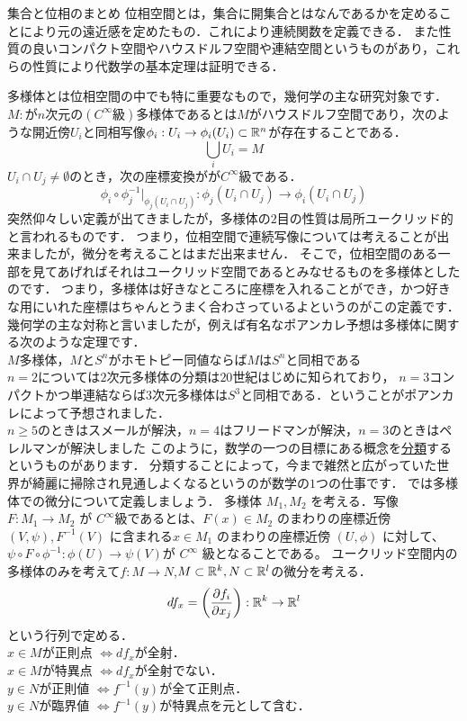 \proofx
\begin{itembox}[l]{集合と位相のまとめ}
位相空間とは，集合に開集合とはなんであるかを定めることにより元の遠近感を定めたもの．これにより連続関数を定義できる．
また性質の良いコンパクト空間やハウスドルフ空間や連結空間というものがあり，これらの性質により代数学の基本定理は証明できる．
\end{itembox}
多様体とは位相空間の中でも特に重要なもので，幾何学の主な研究対象です．
$M:$が$n$次元の$(C^\infty 級)$多様体であるとは$M$がハウスドルフ空間であり，次のような開近傍$U_i$と同相写像$\phi_i : U_i \to \phi_i(U_i) \subset \mathbb R^n$が存在することである．\\
\[ \bigcup_i U_i = M \]
$U_i \cap U_j \neq \emptyset$のとき，次の座標変換がが$C^\infty$級である．
\[
\phi_i \circ \phi_j^{-1} | _{\phi_j(U_i\cap U_j)} :\phi_j(U_i\cap U_j) \to \phi_i(U_i\cap U_j)
\]
突然仰々しい定義が出てきましたが，多様体の$2$目の性質は局所ユークリッド的と言われるものです．
つまり，位相空間で連続写像については考えることが出来ましたが，微分を考えることはまだ出来ません．
そこで，位相空間のある一部を見てあげればそれはユークリッド空間であるとみなせるものを多様体としたのです．
つまり，多様体は好きなところに座標を入れることができ，かつ好きな用にいれた座標はちゃんとうまく合わさっているよというのがこの定義です．
幾何学の主な対称と言いましたが，例えば有名なポアンカレ予想は多様体に関する次のような定理です．
\thm[ポアンカレ予想]
\leavevmode\\
$M$多様体，$M$と$S^n$がホモトピー同値ならば$M$は$S^n$と同相である\\
$n=2$については$2$次元多様体の分類は$20$世紀はじめに知られており，
$n=3$コンパクトかつ単連結ならば$3$次元多様体は$S^3$と同相である．ということがポアンカレによって予想されました．\\
$n\ge 5$のときはスメールが解決，$n = 4$はフリードマンが解決，$n=3$のときはペレルマンが解決しました
\thmx
このように，数学の一つの目標にある概念を\underline{分類}するというものがあります．
分類することによって，今まで雑然と広がっていた世界が綺麗に掃除され見通しよくなるというのが数学の$1$つの仕事です．
では多様体での微分について定義しましょう．
多様体 $M_1, M_2$ を考える．写像 $F : M_1 \to M_2$ が $C^\infty$級であるとは、$F(x) \in M_2$ のまわりの座標近傍 $(V,\psi), F^{-1}(V)$ に含まれる$x\in M_1$ のまわりの座標近傍 $(U, \phi)$ に対して、
$\psi \circ F \circ \phi^{-1} : \phi(U) \to \psi(V )$が $C^\infty$ 級となることである。
ユークリッド空間内の多様体のみを考えて$f:M\to N$,$M\subset\mathbb R^k,N\subset\mathbb R^l$の微分を考える．\\
\[
df_x = \left(\frac{\partial f_i}{\partial x_j}\right):\mathbb R^k\to\mathbb R^l
\]
という行列で定める．\\
$x\in M$が正則点 $\iff df_x$が全射．\\
$x\in M$が特異点 $\iff df_x$が全射でない．\\
$y\in N$が正則値 $\iff f^{-1}(y)$が全て正則点．\\
$y\in N$が臨界値 $\iff f^{-1}(y)$が特異点を元として含む．\\

